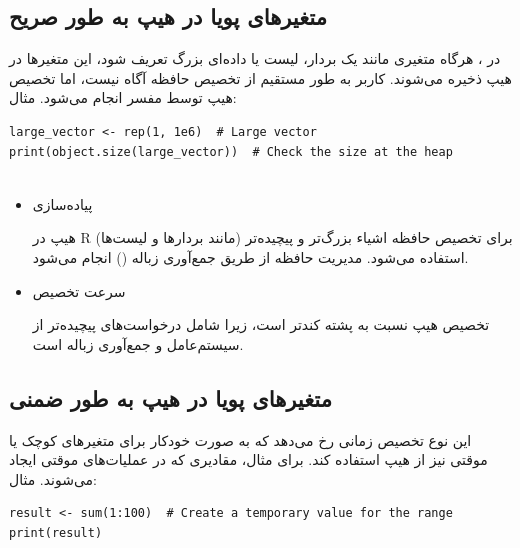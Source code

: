 \documentclass[11pt, a4paper, oneside]{book}
\begin{document}
				
			
			\subsection{متغیرهای پویا در هیپ به طور صریح}
			
				در ، هرگاه متغیری مانند یک بردار، لیست یا داده‌ای بزرگ تعریف شود، این متغیرها در هیپ ذخیره می‌شوند. کاربر به طور مستقیم از تخصیص حافظه آگاه نیست، اما تخصیص هیپ توسط مفسر  انجام می‌شود. مثال:
				
					\begin{latin}
						\begin{lstlisting}[caption={\lr{Dynamic variables on heap explicitly}}] 
large_vector <- rep(1, 1e6)  # Large vector
print(object.size(large_vector))  # Check the size at the heap
							
						\end{lstlisting}
					\end{latin}
					
					\begin{itemize}
						
						\item 
						{\large پیاده‌سازی}
						
						
						هیپ در R برای تخصیص حافظه اشیاء بزرگ‌تر و پیچیده‌تر (مانند بردارها و لیست‌ها) استفاده می‌شود.
						مدیریت حافظه از طریق جمع‌آوری زباله () انجام می‌شود.
						
						
						\item 
						{\large سرعت تخصیص}
						
						
						تخصیص هیپ نسبت به پشته کندتر است، زیرا شامل درخواست‌های پیچیده‌تر از سیستم‌عامل و جمع‌آوری زباله است.
						
					\end{itemize}
			
			\subsection{متغیرهای پویا در هیپ به طور ضمنی}
			
				این نوع تخصیص زمانی رخ می‌دهد که  به صورت خودکار برای متغیرهای کوچک یا موقتی نیز از هیپ استفاده کند. برای مثال، مقادیری که در عملیات‌های موقتی ایجاد می‌شوند. مثال:
				
					\begin{latin}
						\begin{lstlisting}[caption={\lr{Dynamic variables on heap implicitly}}] 
result <- sum(1:100)  # Create a temporary value for the range
print(result)

						\end{lstlisting}
					\end{latin}
					
\end{document}
